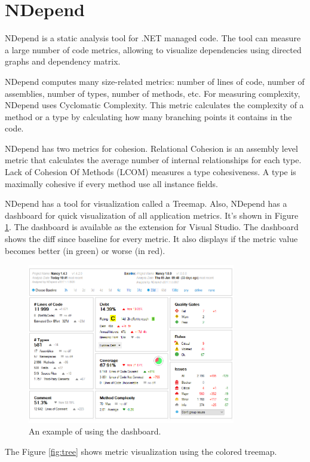 \section{NDepend}

NDepend is a static analysis tool for .NET managed code. The tool can measure a large number of code metrics, allowing to visualize dependencies using directed graphs and dependency matrix.  

NDepend computes many size-related metrics: number of lines of code, number of assemblies, number of types, number of methods, etc. For measuring complexity, NDepend uses Cyclomatic Complexity. This metric calculates the complexity of a method or a type by calculating how many branching points it contains in the code.

NDepend has two metrics for cohesion. Relational Cohesion is an assembly level metric that calculates the average number of internal relationships for each type. Lack of Cohesion Of Methods (LCOM) measures a type cohesiveness. A type is maximally cohesive if every method use all instance fields.

NDepend has a tool for visualization called a Treemap. Also, NDepend has a dashboard for quick visualization of all application metrics. It's shown in Figure \ref{fig:dash}. The dashboard is available as the extension for Visual Studio. The dashboard shows the diff since baseline for every metric. It also displays if the metric value becomes better (in green) or worse (in red). 

\begin{figure}[ht]
	\centering
	\includegraphics[height=70mm]{figures/dash.png}
	\caption{An example of using the dashboard.}
	\label{fig:dash}
\end{figure}

The Figure \ref{fig:tree} shows metric visualization using the colored treemap.

